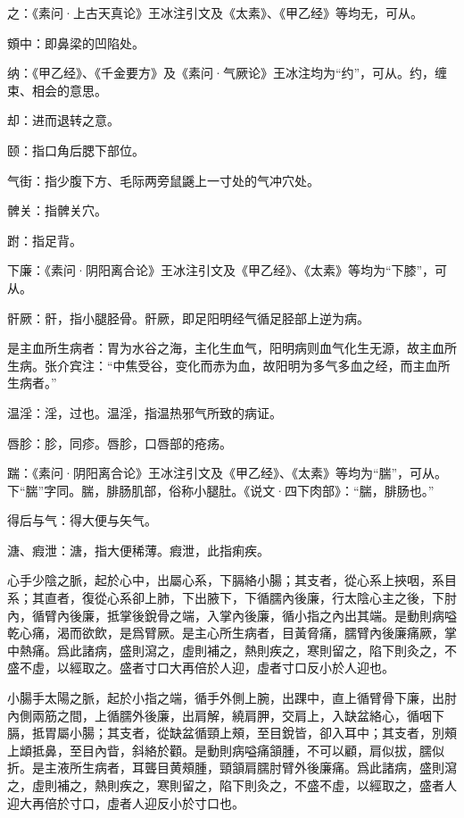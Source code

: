 \documentclass[12pt]{ctexbook}%
\begin{document}
\begin{jiaozhu}
  \item 之：《素问·上古天真论》王冰注引文及《太素》、《甲乙经》等均无，可从。
  \item 頞中：即鼻梁的凹陷处。
  \item 纳：《甲乙经》、《千金要方》及《素问·气厥论》王冰注均为“约”，可从。约，缠束、相会的意思。
  \item 却：进而退转之意。
  \item 颐：指口角后腮下部位。
  \item 气街：指少腹下方、毛际两旁鼠鼷上一寸处的气冲穴处。
  \item 髀关：指髀关穴。
  \item 跗：指足背。
  \item 下廉：《素问·阴阳离合论》王冰注引文及《甲乙经》、《太素》等均为“下膝”，可从。
  \item 骭厥：骭，指小腿胫骨。骭厥，即足阳明经气循足胫部上逆为病。
  \item 是主血所生病者：胃为水谷之海，主化生血气，阳明病则血气化生无源，故主血所生病。张介宾注：“中焦受谷，变化而赤为血，故阳明为多气多血之经，而主血所生病者。”
  \item 温淫：淫，过也。温淫，指温热邪气所致的病证。
  \item 唇胗：胗，同疹。唇胗，口唇部的疮疡。
  \item 踹：《素问·阴阳离合论》王冰注引文及《甲乙经》、《太素》等均为“腨”，可从。下“腨”字同。腨，腓肠肌部，俗称小腿肚。《说文·四下肉部》：“腨，腓肠也。”
  \item 得后与气：得大便与矢气。
  \item 溏、瘕泄：溏，指大便稀薄。瘕泄，此指痢疾。
\end{jiaozhu}


\begin{yuanwen}
心手少陰之脈，起於心中，出屬心系，下膈絡小腸；其支者，從心系上挾咽，系目系；其直者，復從心系卻上肺，下出腋下，下循臑內後廉，行太陰心主之後，下肘內，循臂內後廉，抵掌後銳骨之端，入掌內後廉，循小指之內出其端。是動則病嗌乾心痛，渴而欲飲，是爲臂厥。是主心所生病者，目黃脅痛，臑臂內後廉痛厥，掌中熱痛。爲此諸病，盛則瀉之，虛則補之，熱則疾之，寒則留之，陷下則灸之，不盛不虛，以經取之。盛者寸口大再倍於人迎，虛者寸口反小於人迎也。

小腸手太陽之脈，起於小指之端，循手外側上腕，出踝中，直上循臂骨下廉，出肘內側兩筋之間，上循臑外後廉，出肩解，繞肩胛，交肩上，入缺盆絡心，循咽下膈，抵胃屬小腸；其支者，從缺盆循頸上頰，至目銳皆，卻入耳中；其支者，別頰上䪼抵鼻，至目內眥，斜絡於顴。是動則病嗌痛頷腫，不可以顧，肩似拔，臑似折。是主液所生病者，耳聾目黄頰腫，頸頷肩臑肘臂外後廉痛。爲此諸病，盛則瀉之，虛則補之，熱則疾之，寒則留之，陷下則灸之，不盛不虛，以經取之，盛者人迎大再倍於寸口，虛者人迎反小於寸口也。
\end{yuanwen}
\end{document}

